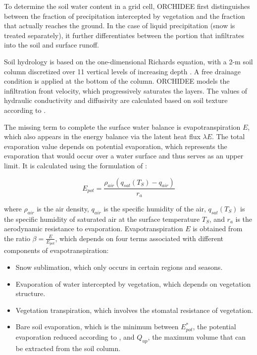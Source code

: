 To determine the soil water content in a grid cell, ORCHIDEE first distinguishes between the fraction of precipitation intercepted by vegetation and the fraction that actually reaches the ground. In the case of liquid precipitation (snow is treated separately), it further differentiates between the portion that infiltrates into the soil and surface runoff.  

Soil hydrology is based on the one-dimensional Richards equation, with a 2-m soil column discretized over 11 vertical levels of increasing depth \citep{de_rosnay_impact_2002, dorgeval_sensitivity_2008}. A free drainage condition is applied at the bottom of the column. ORCHIDEE models the infiltration front velocity, which progressively saturates the layers. The values of hydraulic conductivity and diffusivity are calculated based on soil texture according to \citet{mualem_new_1976, van_genuchten_closed-form_1980}.

The missing term to complete the surface water balance is evapotranspiration $E$, which also appears in the energy balance via the latent heat flux $\lambda E$. The total evaporation value depends on potential evaporation, which represents the evaporation that would occur over a water surface and thus serves as an upper limit. It is calculated using the formulation of \citet{Budyko_1956}:  

\begin{equation}
    E_{pot} = \frac{\rho_{air} (q_{sat}(T_S) - q_{air})}{r_a}
\end{equation}

where $\rho_{air}$ is the air density, $q_{air}$ is the specific humidity of the air, $q_{sat}(T_S)$ is the specific humidity of saturated air at the surface temperature $T_S$, and $r_a$ is the aerodynamic resistance to evaporation.  
Evapotranspiration $E$ is obtained from the ratio $\beta = \frac{E}{E_{pot}}$, which depends on four terms associated with different components of evapotranspiration:  

\begin{itemize}
    \item Snow sublimation, which only occurs in certain regions and seasons.  
    \item Evaporation of water intercepted by vegetation, which depends on vegetation structure.
    \item Vegetation transpiration, which involves the stomatal resistance of vegetation.  
    \item Bare soil evaporation, which is the minimum between $E_{pot}^*$, the potential evaporation reduced according to \citet{milly_potential_1992}, and $Q_{up}$, the maximum volume that can be extracted from the soil column.  
\end{itemize}

